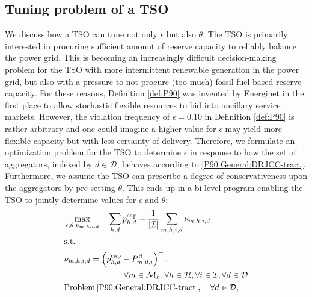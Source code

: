 \documentclass[conference]{IEEEtran}
\begin{document}
\subsection{Tuning problem of a \ac{TSO}}
\vspace{-1mm}
We discuss how a TSO can tune not only $\epsilon$ but also $\theta$. 
The \ac{TSO} is primarily interested in procuring sufficient amount of reserve capacity to reliably balance the power grid. This is becoming an increasingly difficult decision-making problem for the \ac{TSO} with more intermittent renewable generation in the power grid, but also with a pressure to not procure (too much) fossil-fuel based reserve capacity. For these reasons, Definition \ref{def:P90} was invented by Energinet in the first place to allow stochastic flexible resources to bid into ancillary service markets. However, the violation frequency of $\epsilon\!=\!0.10$ in Definition \ref{def:P90} is rather arbitrary and one could imagine a higher value for $\epsilon$ may yield more flexible capacity but with less certainty of delivery. Therefore, we formulate an optimization problem for the \ac{TSO} to determine $\epsilon$ in response to how the set of aggregators, indexed by $d\!\in\!\mathcal{D}$, behaves according to \eqref{P90:General:DRJCC-tract}. Furthermore, we assume the \ac{TSO} can prescribe a degree of conservativeness upon the aggregators by pre-setting $\theta$. This ends up in a bi-level program enabling the TSO to jointly determine values for $\epsilon$ and $\theta$:
%
%
\begin{subequations}\label{P90:TSO}
    \begin{align}
        & \max_{\epsilon, \theta, \nu_{m,h,i,d}} \quad \sum_{h,d} p_{h,d}^{\text{cap}} -  \frac{1}{|\mathcal{I}|}\sum_{m,h,i,d} \nu_{m,h,i,d}     \label{P90:TSO:outer1}                                                                                                                                                                                                  \\
        & \text{s.t.} \nonumber \\
        & \nu_{m,h,i,d} = \left(p_{h,d}^{\text{cap}} - P_{m,d,i}^{\text{B}} \right)^{+}, \notag\\ &\hspace{2.5cm}\forall{m} \in \mathcal{M}_{h},  \forall{h} \in \mathcal{H}, \forall{i} \in \mathcal{I}, \forall{d} \in \mathcal{D} \label{P90:TSO:outer2}   \\
        & \text{Problem} \thinspace \eqref{P90:General:DRJCC-tract}, \quad \forall{d} \in \mathcal{D}, \label{P90:TSO:inner} 
    \end{align}
\end{subequations}
\end{document}
